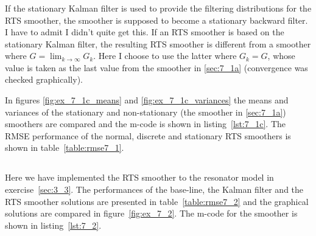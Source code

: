 \documentclass[a4paper,oneside,article]{memoir}
\begin{document}

\clearpage


\subsubsection{}\label{sec:7_1c}
If the stationary Kalman filter is used to provide the filtering distributions for the RTS smoother,
the smoother is supposed to become a stationary backward filter. I have to admit I didn't quite
get this. If an RTS smoother is based on the stationary Kalman filter, the resulting RTS smoother is different
from a smoother where $G=\lim_{k\to\infty}G_k$. Here I choose to use the latter where $G_k=G$, whose
value is taken as the last value from the smoother in \ref{sec:7_1a} (convergence was checked graphically).

In figures \ref{fig:ex_7_1c_means} and \ref{fig:ex_7_1c_variances} the means and variances of the
stationary and non-stationary (the smoother in \ref{sec:7_1a}) smoothers are compared and the m-code
is shown in listing~\ref{lst:7_1c}. The RMSE performance of the normal, discrete and stationary RTS
smoothers is shown in table~\ref{table:rmse7_1}.


\begin{table}[h]
	\centering
	
	\label{table:rmse7_1}
\end{table}

\clearpage

\subsection{}\label{sec:7_2}

Here we have implemented the RTS smoother to the resonator model in exercise~\ref{sec:3_3}.
The performances of the base-line, the Kalman filter and the RTS smoother solutions
are presented in table~\ref{table:rmse7_2} and the graphical solutions are compared
in figure~\ref{fig:ex_7_2}. The m-code for the smoother
is shown in listing~\ref{lst:7_2}.
\end{document}
